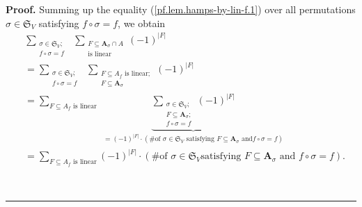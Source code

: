 \documentclass[numbers=enddot,12pt,final,onecolumn,notitlepage]{scrartcl}%
\numberwithin{exer}{section}
\theoremstyle{definition}
\newenvironment{proof}[1][Proof]{\noindent\textbf{#1.} }{\ \rule{0.5em}{0.5em}}
\let\sumnonlimits\sum
\renewcommand{\sum}{\sumnonlimits\limits}
\newenvironment{verlong}{}{}
\begin{document}
\begin{verlong}
\begin{proof}
Summing up the equality (\ref{pf.lem.hamps-by-lin-f.1}) over all permutations
$\sigma\in\mathfrak{S}_{V}$ satisfying $f\circ\sigma=f$, we obtain
\begin{align}
&  \sum_{\substack{\sigma\in\mathfrak{S}_{V};\\f\circ\sigma=f}}\ \ \sum
_{\substack{F\subseteq\mathbf{A}_{\sigma}\cap A\\\text{is linear}}}\left(
-1\right)  ^{\left\vert F\right\vert }\nonumber\\
&  =\sum_{\substack{\sigma\in\mathfrak{S}_{V};\\f\circ\sigma=f}}\ \ \sum
_{\substack{F\subseteq A_{f}\text{ is linear};\\F\subseteq\mathbf{A}_{\sigma}%
}}\left(  -1\right)  ^{\left\vert F\right\vert }\nonumber\\
&  =\sum_{F\subseteq A_{f}\text{ is linear}}\ \ \underbrace{\sum
_{\substack{\sigma\in\mathfrak{S}_{V};\\F\subseteq\mathbf{A}_{\sigma}%
;\\f\circ\sigma=f}}\left(  -1\right)  ^{\left\vert F\right\vert }}_{=\left(
-1\right)  ^{\left\vert F\right\vert }\cdot\left(  \text{\# of }\sigma
\in\mathfrak{S}_{V}\text{ satisfying }F\subseteq\mathbf{A}_{\sigma}\text{ and
}f\circ\sigma=f\right)  }\nonumber\\
&  =\sum_{F\subseteq A_{f}\text{ is linear}}\left(  -1\right)  ^{\left\vert
F\right\vert }\cdot\left(  \text{\# of }\sigma\in\mathfrak{S}_{V}\text{
satisfying }F\subseteq\mathbf{A}_{\sigma}\text{ and }f\circ\sigma=f\right)  .
\label{pf.lem.hamps-by-lin-f.2}%
\end{align}



\end{proof}
\end{verlong}
\end{document}

